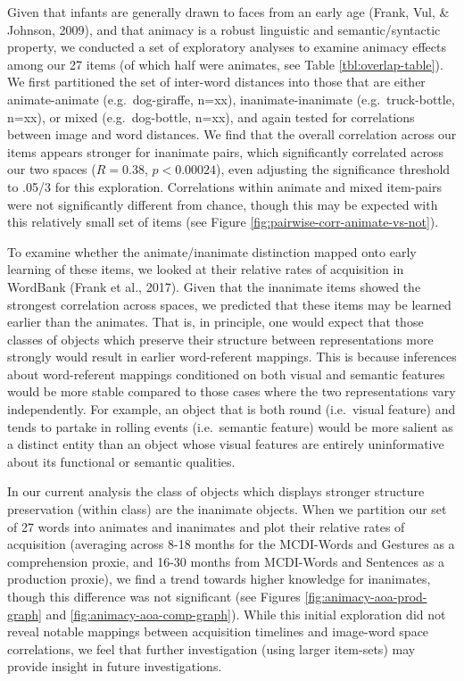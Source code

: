 \documentclass[10pt, letterpaper]{article}
\begin{document}
Given that infants are generally drawn to faces from an early age
(Frank, Vul, \& Johnson, 2009), and that animacy is a robust linguistic
and semantic/syntactic property, we conducted a set of exploratory
analyses to examine animacy effects among our 27 items (of which half
were animates, see Table \ref{tbl:overlap-table}). We first partitioned
the set of inter-word distances into those that are either
animate-animate (e.g.~dog-giraffe, n=xx), inanimate-inanimate
(e.g.~truck-bottle, n=xx), or mixed (e.g.~dog-bottle, n=xx), and again
tested for correlations between image and word distances. We find that
the overall correlation across our items appears stronger for inanimate
pairs, which significantly correlated across our two spaces
(\(R = 0.38\), \(p < 0.00024\)), even adjusting the significance
threshold to .05/3 for this exploration. Correlations within animate and
mixed item-pairs were not significantly different from chance, though
this may be expected with this relatively small set of items (see Figure
\ref{fig:pairwise-corr-animate-vs-not}).

To examine whether the animate/inanimate distinction mapped onto early
learning of these items, we looked at their relative rates of
acquisition in WordBank (Frank et al., 2017). Given that the inanimate
items showed the strongest correlation across spaces, we predicted that
these items may be learned earlier than the animates. That is, in
principle, one would expect that those classes of objects which preserve
their structure between representations more strongly would result in
earlier word-referent mappings. This is because inferences about
word-referent mappings conditioned on both visual and semantic features
would be more stable compared to those cases where the two
representations vary independently. For example, an object that is both
round (i.e.~visual feature) and tends to partake in rolling events
(i.e.~semantic feature) would be more salient as a distinct entity than
an object whose visual features are entirely uninformative about its
functional or semantic qualities.

In our current analysis the class of objects which displays stronger
structure preservation (within class) are the inanimate objects. When we
partition our set of 27 words into animates and inanimates and plot
their relative rates of acquisition (averaging across 8-18 months for
the MCDI-Words and Gestures as a comprehension proxie, and 16-30 months
from MCDI-Words and Sentences as a production proxie), we find a trend
towards higher knowledge for inanimates, though this difference was not
significant (see Figures \ref{fig:animacy-aoa-prod-graph} and
\ref{fig:animacy-aoa-comp-graph}). While this initial exploration did
not reveal notable mappings between acquisition timelines and image-word
space correlations, we feel that further investigation (using larger
item-sets) may provide insight in future investigations.
\end{document}
